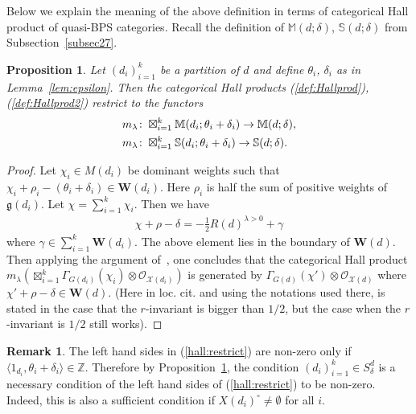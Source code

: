 \documentclass [11pt,oneside,a4paper,mathscr]{amsart}
\newtheorem{prop}[thm]{Proposition}
\theoremstyle{definition}
\newtheorem{remark}[thm]{Remark}
\renewcommand{\leq}{\leqslant}
\newcommand{\X}{\mathscr{X}}
\begin{document}
Below we explain the meaning of the above definition 
in terms of categorical Hall product of quasi-BPS categories. 
Recall the definition of 
$\mathbb{M}(d; \delta)$, $\mathbb{S}(d; \delta)$ from Subsection~\ref{subsec27}. 
\begin{prop}\label{prop:partition}
Let $(d_i)_{i=1}^k$ be a partition 
of $d$ and define $\theta_i$, $\delta_i$ as in 
Lemma~\ref{lem:epsilon}. 
Then the categorical Hall products (\ref{def:Hallprod}), (\ref{def:Hallprod2})
restrict to the functors
\begin{align}\label{hall:restrict}
&m_{\lambda} \colon 
\boxtimes_{i=1}^k\mathbb{M}(d_i; \theta_i+\delta_{i})\to \mathbb{M}(d; \delta), \\
&\notag m_{\lambda} \colon \boxtimes_{i=1}^k \mathbb{S}(d_i; \theta_i+\delta_{i}) \to 
\mathbb{S}(d; \delta). 
\end{align}
\end{prop}
\begin{proof}
Let $\chi_i \in M(d_i)$ be dominant weights such that 
$\chi_i+\rho_i-(\theta_i+\delta_{i}) \in \mathbf{W}(d_i)$. 
Here $\rho_i$ is half the sum of positive weights of $\mathfrak{g}(d_i)$. 
Let $\chi=\sum_{i=1}^k \chi_i$. 
Then we have 
\begin{align*}
    \chi+\rho-\delta=-\frac{1}{2}R(d)^{\lambda>0}+\gamma
\end{align*}
where $\gamma \in \sum_{i=1}^k \mathbf{W}(d_i)$. 
The above element lies in the boundary of $\mathbf{W}(d)$. 
Then applying the argument of~\cite[Propositions 3.5 and 3.6]{P}, 
one concludes that the categorical Hall product
$m_{\lambda}\left(\boxtimes_{i=1}^k \Gamma_{G(d_i)}(\chi_i)\otimes \mathcal{O}_{\X(d_i)}\right)$
is generated by $\Gamma_{G(d)}(\chi') \otimes \mathcal{O}_{\X(d)}$ 
where $\chi'+\rho-\delta \in \mathbf{W}(d)$. 
(Here in loc. cit. and using the notations used there, \cite[Proposition 3.6]{P} is stated 
in the case that the $r$-invariant is bigger than $1/2$, 
but the case when the $r$-invariant is $1/2$ still works).
 \end{proof}

 \begin{remark}\label{rmk:partition}
 The left hand sides in (\ref{hall:restrict}) are non-zero 
 only if $\langle 1_{d_i}, \theta_i+\delta_i \rangle \in \mathbb{Z}$. 
 Therefore by Proposition~\ref{prop:partition}, the condition 
    $(d_i)_{i=1}^k \in S_{\delta}^d$ is a necessary 
     condition of the left hand sides of (\ref{hall:restrict}) to be non-zero. 
     Indeed, this is also a sufficient condition 
     if $X(d_i)^{\circ} \neq \emptyset$ for all $i$. 
 \end{remark}
\end{document}
